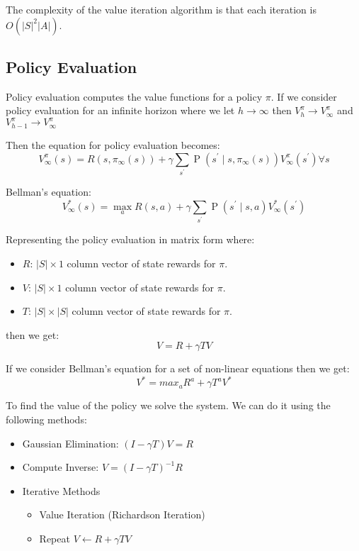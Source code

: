 \documentclass[12pt]{article}
\begin{document}
            The complexity of the value iteration algorithm is that each iteration is $O(|S|^2|A|)$.

        \subsection{Policy Evaluation}
            Policy evaluation computes the value functions for a policy $\pi$. If we consider policy evaluation for an
            infinite horizon where we let $h \rightarrow \infty$ then $V_h^{\pi} \rightarrow V_{\infty}^{\pi}$ and
            $V_{h-1}^{\pi} \rightarrow V_{\infty}^{\pi}$
            
            Then the equation for policy evaluation becomes:
            $$V_{\infty}^{\pi}(s)=R\left(s, \pi_{\infty}(s)\right)+\gamma \sum_{s^{\prime}} \operatorname{P}\left(s^{\prime} \mid s, \pi_{\infty}(s)\right) V_{\infty}^{\pi}\left(s^{\prime}\right) \forall s$$

            Bellman's equation:
            $$V_{\infty}^{*}(s)=\max _{a} R(s, a)+\gamma \sum_{s^{\prime}} \operatorname{P}\left(s^{\prime} \mid s, a\right) V_{\infty}^{*}\left(s^{\prime}\right)$$

            Representing the policy evaluation in matrix form where:
            \begin{itemize}
                \item $R$: $|S| \times 1$ column vector of state rewards for $\pi$.
                \item $V$: $|S| \times 1$ column vector of state rewards for $\pi$.
                \item $T$: $|S| \times |S|$ column vector of state rewards for $\pi$.
            \end{itemize}

            then we get:
            $$ V = R + \gamma TV $$

            If we consider Bellman's equation for a set of non-linear equations then we get:
            $$ V^* = max_a R^a + \gamma T^a V^* $$

            To find the value of the policy we solve the system. We can do it using the following
            methods:

            \begin{itemize}
                \item Gaussian Elimination: $(I - \gamma T)V = R$
                \item Compute Inverse: $V = (I - \gamma T)^{-1}R$
                \item Iterative Methods \begin{itemize}
                    \item Value Iteration (Richardson Iteration)
                    \item Repeat $V \gets R + \gamma TV$
                \end{itemize}
            \end{itemize}
            
\end{document}
